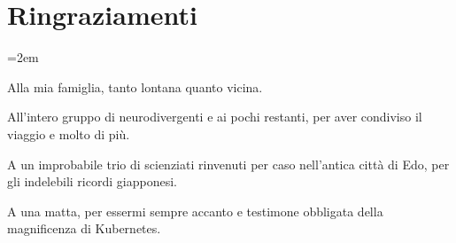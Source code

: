 \chapter*{Ringraziamenti}
{}

\begingroup
\setlength{\parindent}{0pt}
\setlength{\parskip}{1.6\baselineskip}
\emergencystretch=2em

\large
\RaggedRight

Alla mia famiglia, tanto lontana quanto vicina.

All'intero gruppo di neurodivergenti e ai pochi restanti, per aver condiviso il viaggio e molto di più.

A un improbabile trio di scienziati rinvenuti per caso nell'antica città di Edo, per gli indelebili ricordi giapponesi.

A una matta, per essermi sempre accanto e testimone obbligata della magnificenza di Kubernetes.

\endgroup
